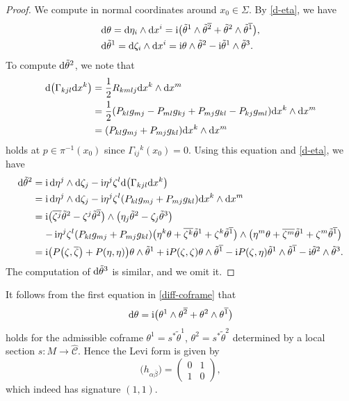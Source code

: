 \documentclass[11pt]{article}
\numberwithin{equation}{section}
\renewcommand\a{\alpha}
\renewcommand\b{\beta}
\renewcommand\th{\theta}
\newcommand\ol{\overline}
\newcommand{\wh}{\widehat}
\numberwithin{equation}{section}
\begin{document}
\begin{proof}
We compute in normal coordinates around $x_0\in\Sigma$. By \eqref{d-eta}, we have
\begin{align*}
&{\rm d}\theta={\rm d}\eta_i\wedge {\rm d}x^i={\rm i}\bigl(\tilde\theta^1\wedge\tilde\theta^{\ol2}+\tilde\theta^2\wedge\tilde\theta^{\ol1}\bigr), \\
&{\rm d}\tilde\th^1={\rm d}\zeta_i\wedge {\rm d}x^i={\rm i}\theta\wedge\tilde\theta^2-{\rm i}\tilde\theta^1\wedge\tilde\theta^3.
\end{align*}
To compute ${\rm d}\tilde\theta^2$, we note that
\begin{align*}
{\rm d}\bigl(\Gamma_{kjl} {\rm d}x^k\bigr)&=\frac{1}{2}R_{kmlj}{\rm d}x^k\wedge {\rm d}x^m \\
&=\frac{1}{2}(P_{kl}g_{mj}-P_{ml}g_{kj}+P_{mj}g_{kl}-P_{kj}g_{ml}){\rm d}x^k\wedge {\rm d}x^m \\
&=(P_{kl}g_{mj}+P_{mj}g_{kl}){\rm d}x^k\wedge {\rm d}x^m
\end{align*}
holds at $p\in \pi^{-1}(x_0)$ since $\Gamma_{ij}{}^k(x_0)=0$. Using this equation and \eqref{d-eta}, we have
\begin{align*}
{\rm d}\tilde\theta^2={}&{\rm i}\,{\rm d}\eta^j\wedge {\rm d}\zeta_j-{\rm i}\eta^j\zeta^l{\rm d}\bigl(\Gamma_{kjl} {\rm d}x^k\bigr) \\
={}&{\rm i}\,{\rm d}\eta^j\wedge {\rm d}\zeta_j-{\rm i}\eta^j\zeta^l (P_{kl}g_{mj}+P_{mj}g_{kl}){\rm d}x^k\wedge {\rm d}x^m \\
={}&{\rm i}\bigl(\ol{\zeta^j}\tilde\th^2-\zeta^j\tilde\th^{\ol2}\bigr)\wedge\bigl(\eta_j\tilde\theta^2-\zeta_j\tilde\theta^3\bigr) \\
&{-}\,{\rm i}\eta^j\zeta^l (P_{kl}g_{mj}+P_{mj}g_{kl})\bigl(\eta^k\theta+\ol{\zeta^k}\tilde\theta^1+\zeta^k\tilde\theta^{\ol1}\bigr)\wedge \bigl(\eta^m\theta+\ol{\zeta^m}\tilde\theta^1+\zeta^m\tilde\theta^{\ol1}\bigr) \\
={}&{\rm i}\bigl(P\bigl(\zeta, \ol\zeta\bigr)+P(\eta, \eta)\bigr)\theta\wedge\tilde\theta^1+{\rm i}P(\zeta, \zeta)\theta\wedge\tilde\theta^{\ol1} -{\rm i}P(\zeta, \eta)\tilde\theta^1\wedge\tilde\theta^{\ol1}-{\rm i}\tilde\theta^2\wedge\tilde\theta^3.
\end{align*}
The computation of ${\rm d}\tilde\th^3$ is similar, and we omit it.
\end{proof}

It follows from the first equation in \eqref{diff-coframe} that
\[
{\rm d}\th={\rm i}\bigl(\theta^1\wedge\theta^{\ol2}+\theta^2\wedge\theta^{\ol1}\bigr)
\]
holds for the admissible coframe $\th^1=s^*\tilde \th^1$, $\th^2=s^*\tilde \th^2$ determined by a local section $s\colon M\to \wh{\mathcal{C}}$. Hence the Levi form is given by
\[
\bigl(h_{\a\ol\b}\bigr)=\begin{pmatrix} 0 & 1 \\ 1 & 0 \end{pmatrix},
\]
which indeed has signature $(1, 1)$.
\end{document}
